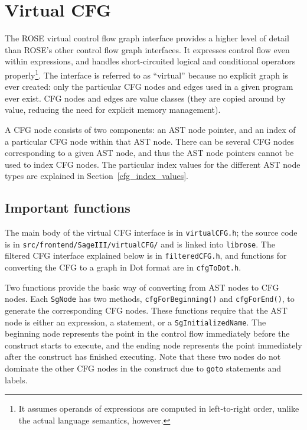 \chapter{Virtual CFG}

The ROSE virtual control flow graph interface provides a higher level of
detail than ROSE's other control flow graph interfaces.  It expresses
control flow even within expressions, and handles short-circuited logical
and conditional operators properly\footnote{It assumes operands of
expressions are computed in left-to-right order, unlike the actual language
semantics, however.}.  The interface is referred to as ``virtual'' because
no explicit graph is ever created: only the particular CFG nodes and edges
used in a given program ever exist.  CFG nodes and edges are value classes
(they are copied around by value, reducing the need for explicit memory
management).

A CFG node consists of two components: an AST node pointer, and an index of
a particular CFG node within that AST node.  There can be several CFG nodes
corresponding to a given AST node, and thus the AST node pointers cannot be
used to index CFG nodes.  The particular index values for the different AST
node types are explained in Section~\ref{cfg_index_values}.

\section{Important functions}

The main body of the virtual CFG interface is in \lstinline{virtualCFG.h};
the source code is in \lstinline{src/frontend/SageIII/virtualCFG/} and is
linked into \lstinline{librose}.  The filtered CFG interface explained
below is in \lstinline{filteredCFG.h}, and functions for converting the CFG
to a graph in Dot format are in \lstinline{cfgToDot.h}.

Two functions provide the basic way of converting from AST nodes to CFG
nodes.  Each \lstinline{SgNode} has two methods,
\lstinline{cfgForBeginning()} and \lstinline{cfgForEnd()}, to generate the
corresponding CFG nodes.  These functions require that the AST node is
either an expression, a statement, or a \lstinline{SgInitializedName}.  The
beginning node represents the point in the control flow immediately before
the construct starts to execute, and the ending node represents the point
immediately after the construct has finished executing.  Note that these
two nodes do not dominate the other CFG nodes in the construct due to
\lstinline{goto} statements and labels.

